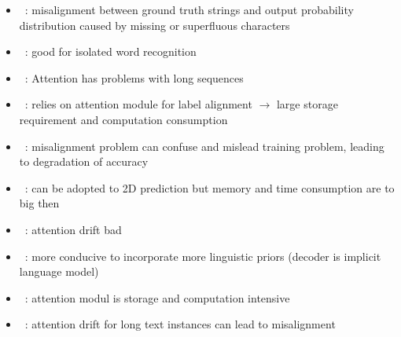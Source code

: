 \begin{itemize}
\begin{itemize}
\begin{itemize}
                    \item~\cite{liao_scene_2018}: misalignment between ground truth strings and
                        output probability distribution caused by missing or superfluous characters
                    \item~\cite{chen_text_2021}: good for isolated word recognition
                    \item~\cite{chen_text_2021}: Attention has problems with long sequences
                    \item~\cite{xie_aggregation_2019}: relies on attention module for label alignment
                        $\rightarrow$ large storage requirement and computation consumption
                    \item~\cite{xie_aggregation_2019}: misalignment problem can confuse and mislead
                        training problem, leading to degradation of accuracy
                    \item~\cite{xie_aggregation_2019}: can be adopted to 2D prediction but
                        memory and time consumption are to big then
                    \item~\cite{cheng_focusing_2017}: attention drift bad
                    \item~\cite{long_scene_2021}: more conducive to incorporate more linguistic
                        priors (decoder is implicit language model)
                    \item~\cite{chen_text_2021}: attention modul is storage and computation
                        intensive
                    \item~\cite{chen_text_2021}: attention drift for long text instances can lead
                        to misalignment
                \end{itemize}
        \end{itemize}
\end{itemize}

